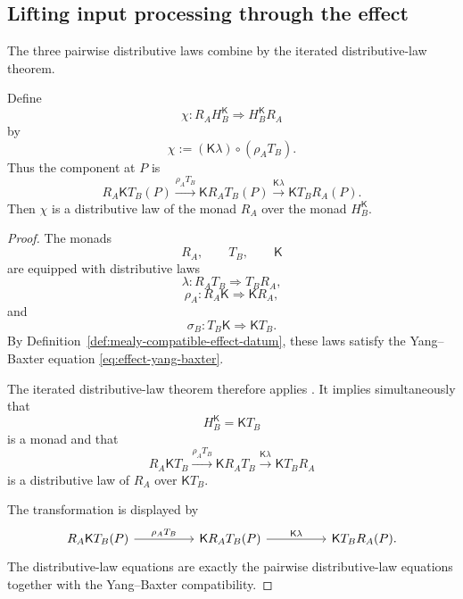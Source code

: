 \subsection{Lifting input processing through the effect}
\label{subsec:effectful-input-processing-lift}

The three pairwise distributive laws combine by the iterated
distributive-law theorem.

\begin{proposition}
\label{prop:effectful-input-distributive-law}
    Define
    \[
        \chi:
        R_AH_B^{\mathsf K}
        \Rightarrow
        H_B^{\mathsf K}R_A
    \]
    by
    \[
        \chi
        :=
        (\mathsf K\lambda)
        \circ
        (\rho_A T_B).
    \]
    Thus the component at \(P\) is
    \[
        R_A\mathsf K T_B(P)
        \xrightarrow{\rho_A T_B}
        \mathsf K R_AT_B(P)
        \xrightarrow{\mathsf K\lambda}
        \mathsf K T_BR_A(P).
    \]
    Then \(\chi\) is a distributive law of the monad \(R_A\) over the monad
    \(H_B^{\mathsf K}\).
\end{proposition}
\begin{proof}
    The monads
    \[
        R_A,
        \qquad
        T_B,
        \qquad
        \mathsf K
    \]
    are equipped with distributive laws
    \[
        \lambda:
        R_AT_B\Rightarrow T_BR_A,
    \]
    \[
        \rho_A:
        R_A\mathsf K\Rightarrow\mathsf K R_A,
    \]
    and
    \[
        \sigma_B:
        T_B\mathsf K\Rightarrow\mathsf K T_B.
    \]
    By Definition~\ref{def:mealy-compatible-effect-datum}, these laws satisfy
    the Yang--Baxter equation
    \eqref{eq:effect-yang-baxter}.

    The iterated distributive-law theorem therefore applies
    \cite{ChengIteratedDistributiveLaws}. It implies simultaneously that
    \[
        H_B^{\mathsf K}
        =
        \mathsf K T_B
    \]
    is a monad and that
    \[
        R_A\mathsf K T_B
        \xrightarrow{\rho_A T_B}
        \mathsf K R_AT_B
        \xrightarrow{\mathsf K\lambda}
        \mathsf K T_BR_A
    \]
    is a distributive law of \(R_A\) over \(\mathsf K T_B\).

    The transformation is displayed by
    \[
        \begin{tikzcd}[column sep=huge]
                R_A\mathsf K T_B(P)
                    \arrow[r, "\rho_A T_B"]
            &
                \mathsf K R_AT_B(P)
                    \arrow[r, "\mathsf K\lambda"]
            &
                \mathsf K T_BR_A(P).
        \end{tikzcd}
    \]
    The distributive-law equations are exactly the pairwise distributive-law
    equations together with the Yang--Baxter compatibility.
\end{proof}

